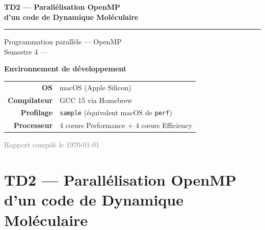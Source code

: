 \documentclass[12pt,a4paper]{article}
\begin{document}
\begin{titlepage}
\begin{center}
\vspace*{2cm}

{\Huge\bfseries\color{mainblue} TD2 — Parallélisation OpenMP}\\[0.6cm]
{\Huge\bfseries\color{mainblue} d'un code de Dynamique Moléculaire}

\vspace{1.5cm}

\textcolor{accentblue}{\rule{0.6\linewidth}{1.5pt}}

\vspace{1.5cm}

{\Large\color{mainblue!80} Programmation parallèle — OpenMP}\\[0.4cm]
{\large Semestre 4 — \the\year}

\vspace{2cm}

\begin{tcolorbox}[
  colback=lightblue,
  colframe=mainblue,
  width=0.7\linewidth,
  arc=5pt,
  boxrule=1.2pt,
  halign=center
]
  {\large\bfseries\color{mainblue} Environnement de développement}\\[0.5em]
  \begin{tabular}{rl}
    \textbf{OS}         & macOS (Apple Silicon) \\
    \textbf{Compilateur} & GCC 15 via Homebrew \\
    \textbf{Profilage}   & \texttt{sample} (équivalent macOS de \texttt{perf}) \\
    \textbf{Processeur}  & 4 cœurs Performance + 4 cœurs Efficiency \\
  \end{tabular}
\end{tcolorbox}

\vfill

\textcolor{gray}{\small Rapport compilé le \today}

\end{center}
\end{titlepage}

\tableofcontents
\newpage

\section{TD2 — Parallélisation OpenMP d'un code de Dynamique Moléculaire}
\end{document}

